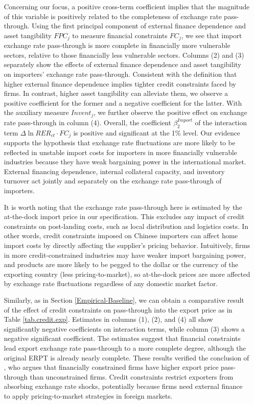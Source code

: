 \documentclass[12pt]{article}
\begin{document}
Concerning our focus, a positive cross-term coefficient implies that the magnitude of this variable is positively related to the completeness of exchange rate pass-through. Using the first principal component of external finance dependence and asset tangibility $FPC_j$ to measure financial constraints $FC_j$, we see that import exchange rate pass-through is more complete in financially more vulnerable sectors, relative to those financially less vulnerable sectors. Columns (2) and (3) separately show the effects of external finance dependence and asset tangibility on importers' exchange rate pass-through. Consistent with the definition that higher external finance dependence implies tighter credit constraints faced by firms. In contrast, higher asset tangibility can alleviate them, we observe a positive coefficient for the former and a negative coefficient for the latter. With the auxiliary measure $Invent_j$, we further observe the positive effect on exchange rate pass-through in column (4). Overall, the coefficient $\beta^{Import}_2$ of the interaction term $\Delta \ln RER_{ct} \cdot FC_{j}$ is positive and significant at the 1\% level. Our evidence supports the hypothesis that exchange rate fluctuations are more likely to be reflected in unstable import costs for importers in more financially vulnerable industries because they have weak bargaining power in the international market. External financing dependence, internal collateral capacity, and inventory turnover act jointly and separately on the exchange rate pass-through of importers.

It is worth noting that the exchange rate pass-through here is estimated by the at-the-dock import price in our specification. This excludes any impact of credit constraints on post-landing costs, such as local distribution and logistics costs. In other words, credit constraints imposed on Chinese importers can affect home import costs by directly affecting the supplier's pricing behavior. Intuitively, firms in more credit-constrained industries may have weaker import bargaining power, and products are more likely to be pegged to the dollar or the currency of the exporting country (less pricing-to-market), so at-the-dock prices are more affected by exchange rate fluctuations regardless of any domestic market factor.

Similarly, as in Section \ref{Empirical-Baseline}, we can obtain a comparative result of the effect of credit constraints on pass-through into the export price as in Table \ref{tab.credit.exp}. Estimates in columns (1), (2), and (4) all show significantly negative coefficients on interaction terms, while column (3) shows a negative significant coefficient. The estimates suggest that financial constraints lead export exchange rate pass-through to a more complete degree, although the original ERPT is already nearly complete. These results verified the conclusion of \cite{strasser2013}, who argues that financially constrained firms have higher export price pass-through than unconstrained firms. Credit constraints restrict exporters from absorbing exchange rate shocks, potentially because firms need external finance to apply pricing-to-market strategies in foreign markets.
\end{document}
